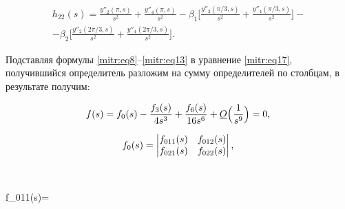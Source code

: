 \begin{lemma}[3]
\begin{multline}
\end{multline}

\begin{multline}

h_{22}(s)=\frac{y''_2(\pi,s)}{s^2}+\frac{y''_4(\pi,s)}{s^2}-\beta_1\bigg[

\frac{y''_2(\pi/3,s)}{s^2}+

\frac{y''_4(\pi/3,s)}{s^2}\bigg]-\\-

\beta_2\bigg[

\frac{y''_2({2\pi}/3,s)}{s^2}+\frac{y''_4({2\pi}/3,s)}{s^2}\bigg].

\end{multline}




\end{lemma}

\smallskip





Подставляя формулы \eqref{mitr:eq8}--\eqref{mitr:eq13} в уравнение \eqref{mitr:eq17}, получившийся определитель разложим на сумму определителей по столбцам, в результате получим:

\begin{equation}

\label{mitr:eq18}

f(s)=f_0(s)-\frac{f_3(s)}{4s^3}+\frac{f_6(s)}{16s^6}+\underline O\Bigl(\frac1{s^9}\Bigr)=0,\\

\end{equation}

\begin{equation}

\label{mitr:eq22}

f_0(s)= \begin{vmatrix}

f_{011} (s) &f_{012} (s)\\

f_{021} (s) &f_{022}(s)

\end{vmatrix},\\ 

\end{equation}


$$

f_{011}(s)=

